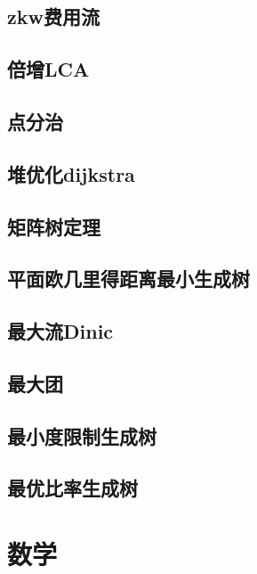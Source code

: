\documentclass[a4paper]{article}
\begin{document}
\subsection{zkw费用流}

\subsection{倍增LCA}

\subsection{点分治}

\subsection{堆优化dijkstra}

\subsection{矩阵树定理}

\subsection{平面欧几里得距离最小生成树}

\subsection{最大流Dinic}

\subsection{最大团}

\subsection{最小度限制生成树}

\subsection{最优比率生成树}

\section{数学}
\end{document}
